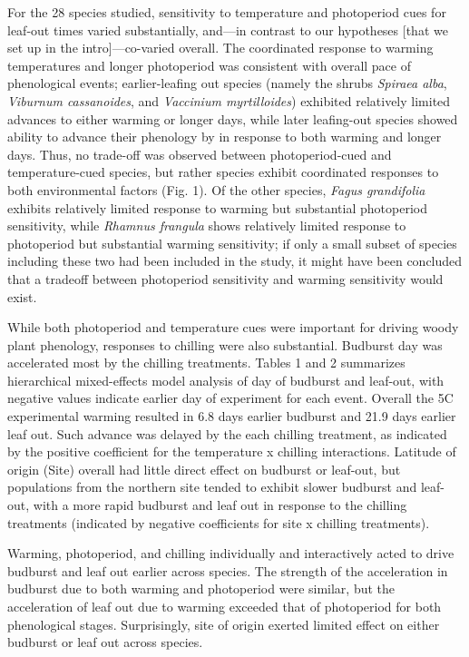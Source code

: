\documentclass[11pt]{article}
\begin{document}
For the 28 species studied, sensitivity to temperature and photoperiod cues for leaf-out times varied substantially, and---in contrast to our hypotheses [that we set up in the intro]---co-varied overall. The coordinated response to warming temperatures and longer photoperiod was consistent with overall pace of phenological events; earlier-leafing out species (namely the shrubs \emph{Spiraea alba}, \emph{Viburnum cassanoides}, and \emph{Vaccinium myrtilloides}) exhibited relatively limited advances to either warming or longer days, while later leafing-out species showed ability to advance their phenology by in response to both warming and longer days. Thus, no trade-off was observed between photoperiod-cued and temperature-cued species, but rather species exhibit coordinated responses to both environmental factors (Fig. 1). Of the other species, \emph{Fagus grandifolia} exhibits relatively limited response to warming but substantial photoperiod sensitivity, while \emph{Rhamnus frangula} shows relatively limited response to photoperiod but substantial warming sensitivity; if only a small subset of species including these two had been included in the study, it might have been concluded that a tradeoff between photoperiod sensitivity and warming sensitivity would exist. 

While both photoperiod and temperature cues were important for driving woody plant phenology, responses to chilling were also substantial. Budburst day was accelerated most by the chilling treatments. Tables 1 and 2 summarizes hierarchical mixed-effects model analysis of day of budburst and leaf-out, with negative values indicate earlier day of experiment for each event. Overall the 5\degree C experimental warming resulted in 6.8 days earlier budburst and 21.9 days earlier leaf out. Such advance was delayed by the each chilling treatment, as indicated by the positive coefficient for the temperature x chilling interactions. Latitude of origin (Site) overall had little direct effect on budburst or leaf-out, but populations from the northern site tended to exhibit slower budburst and leaf-out, with a more rapid budburst and leaf out in response to the chilling treatments (indicated by negative coefficients for site x chilling treatments).

Warming, photoperiod, and chilling individually and interactively acted to drive budburst and leaf out earlier across species. The strength of the acceleration in budburst due to both warming and photoperiod were similar, but the acceleration of leaf out due to warming exceeded that of photoperiod for both phenological stages. Surprisingly, site of origin exerted limited effect on either budburst or leaf out across species. 
\end{document}
